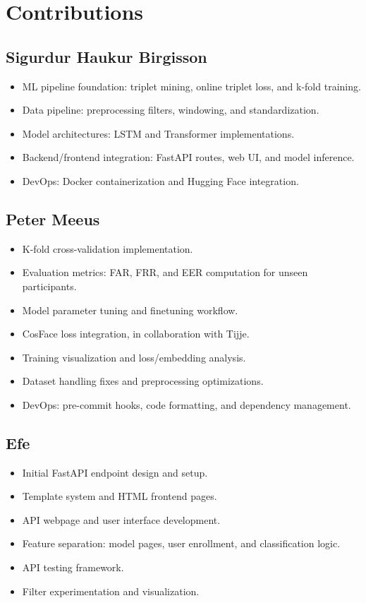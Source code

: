 \newpage
\section{Contributions}

\subsection*{Sigurdur Haukur Birgisson}

\begin{itemize}
    \item ML pipeline foundation: triplet mining, online triplet loss, and k-fold training.
    \item Data pipeline: preprocessing filters, windowing, and standardization.
    \item Model architectures: LSTM and Transformer implementations.
    \item Backend/frontend integration: FastAPI routes, web UI, and model inference.
    \item DevOps: Docker containerization and Hugging Face integration.
\end{itemize}

\subsection*{Peter Meeus}

\begin{itemize}
    \item K-fold cross-validation implementation.
    \item Evaluation metrics: FAR, FRR, and EER computation for unseen participants.
    \item Model parameter tuning and finetuning workflow.
    \item CosFace loss integration, in collaboration with Tijje.
    \item Training visualization and loss/embedding analysis.
    \item Dataset handling fixes and preprocessing optimizations.
    \item DevOps: pre-commit hooks, code formatting, and dependency management.
\end{itemize}

\subsection*{Efe}

\begin{itemize}
    \item Initial FastAPI endpoint design and setup.
    \item Template system and HTML frontend pages.
    \item API webpage and user interface development.
    \item Feature separation: model pages, user enrollment, and classification logic.
    \item API testing framework.
    \item Filter experimentation and visualization.
\end{itemize}

